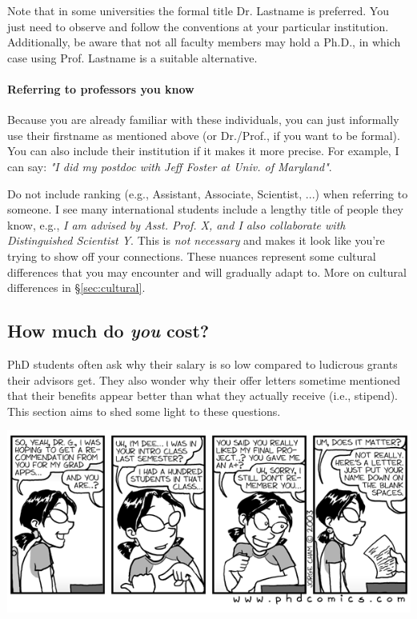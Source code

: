 \documentclass[11pt]{article}
\begin{document}
Note that in some universities the formal title Dr. Lastname is preferred. You just need to observe and follow the conventions at your particular institution. Additionally, be aware that not all faculty members may hold a Ph.D., in which case using Prof. Lastname is a suitable alternative.


\paragraph{Referring to professors you know} Because you are already familiar with these individuals, you can just informally use their firstname as mentioned above (or Dr./Prof., if you want to be formal). You can also include their institution if it makes it more precise.  For example, I can say:  \emph{"I did my postdoc with Jeff Foster at Univ. of Maryland"}.   

Do not include ranking (e.g., Assistant, Associate, Scientist, ...) when referring to someone. I see many international students include a lengthy title of people they know, e.g., \emph{I am advised by Asst. Prof. X, and I also collaborate with Distinguished Scientist Y}.  This is \emph{not necessary} and makes it look like you're trying to show off your connections. These nuances represent some cultural differences that you may encounter and will gradually adapt to. More on cultural differences in \S\ref{sec:cultural}.

\subsection{How much do \emph{you} cost?}\label{sec:ra-cost}
PhD students often ask why their salary is so low compared to ludicrous grants their advisors get. They also wonder why their offer letters sometime mentioned that their benefits appear better than what they actually receive (i.e., stipend).  This section aims to shed some light to these questions.

      \begin{center}
        \includegraphics[scale=0.3]{c6.png}
      \end{center}
\end{document}
